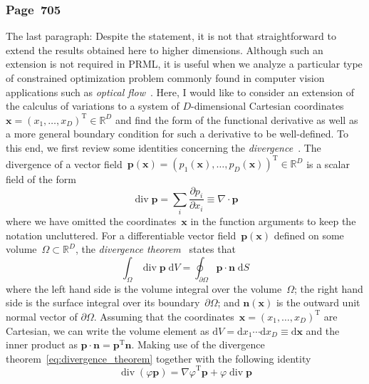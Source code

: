 \documentclass[12pt,a4paper]{article}
\newcommand{\erratum}[1]{\subsubsection*{#1}}
\begin{document}
\erratum{Page~705}
The last paragraph:
Despite the statement,
it is not that straightforward to extend the results obtained here to higher dimensions.
Although such an extension is not required in PRML, it is useful when we analyze
a particular type of constrained optimization problem commonly found in
computer vision applications such as \emph{optical flow}~\citep{HornSchunck:OpticalFlow}.
Here, I would like to consider an extension of the calculus of variations to
a system of $D$-dimensional Cartesian coordinates~$\mathbf{x} =
\left( x_1, \dots, x_D \right)^{\operatorname{T}} \in \mathbb{R}^{D}$
and find the form of the functional derivative as well as a more general boundary condition
for such a derivative to be well-defined.
To this end, we first review some identities concerning
the \emph{divergence}~\citep{Feynman:FeynmanLectures2}.
The divergence of a vector field~$\mathbf{p}(\mathbf{x}) =
\left( p_1(\mathbf{x}), \dots, p_D(\mathbf{x}) \right)^{\operatorname{T}} \in \mathbb{R}^{D}$
is a scalar field of the form
\begin{equation}
\operatorname{div} \mathbf{p} = \sum_{i} \frac{\partial p_i}{\partial x_i} \equiv
\nabla \cdot \mathbf{p}
\end{equation}
where we have omitted the coordinates~$\mathbf{x}$ in the function arguments
to keep the notation uncluttered.
For a differentiable vector field~$\mathbf{p}(\mathbf{x})$ defined on
some volume~$\Omega \subset \mathbb{R}^D$,
the \emph{divergence theorem}~\citep{Feynman:FeynmanLectures2} states that
\begin{equation}
\int_{\Omega} \operatorname{div} \mathbf{p} \; \mathrm{d}V =
\oint_{\partial\Omega} \mathbf{p} \cdot \mathbf{n} \; \mathrm{d}S
\label{eq:divergence_theorem}
\end{equation}
where the left hand side is the volume integral over the volume~$\Omega$;
the right hand side is the surface integral over its boundary~$\partial\Omega$; and
$\mathbf{n}(\mathbf{x})$ is the outward unit normal vector of $\partial\Omega$.
Assuming that the coordinates~$\mathbf{x} = \left( x_1, \dots, x_D \right)^{\operatorname{T}}$ are
Cartesian, we can write the volume element as
$\mathrm{d}V = \mathrm{d}x_1 \cdots \mathrm{d}x_D \equiv \mathrm{d}\mathbf{x}$ and
the inner product as $\mathbf{p} \cdot \mathbf{n} = \mathbf{p}^{\operatorname{T}} \mathbf{n}$.
Making use of the divergence theorem~\eqref{eq:divergence_theorem}
together with the following identity
\begin{equation}
\operatorname{div}\left(\varphi\mathbf{p}\right) =
{\nabla\varphi}^{\operatorname{T}} \mathbf{p} + \varphi \operatorname{div}\mathbf{p}
\end{equation}
\end{document}
